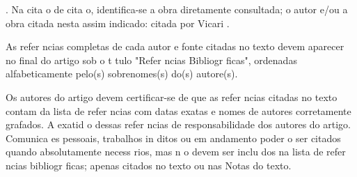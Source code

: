\documentclass{article}
\begin{document}
. Na cita o de cita o, identifica-se a obra diretamente consultada; o autor e/ou a obra citada nesta   assim indicado: \cite{knuth:84} citada por Vicari \cite{teste}.

As refer ncias completas de cada autor e fonte citadas no texto devem aparecer no final do artigo sob o t tulo "Refer ncias Bibliogr ficas", ordenadas alfabeticamente pelo(s) sobrenomes(s) do(s) autore(s).

Os autores do artigo devem certificar-se de que as refer ncias citadas no texto contam da lista de refer ncias com datas exatas e nomes de autores corretamente grafados. A exatid o dessas refer ncias   de responsabilidade dos autores do artigo. Comunica es pessoais, trabalhos in ditos ou em andamento poder o ser citados quando absolutamente necess rios, mas n o devem ser inclu dos na lista de refer ncias bibliogr ficas; apenas citados no texto ou nas Notas do texto.

\end{document}
